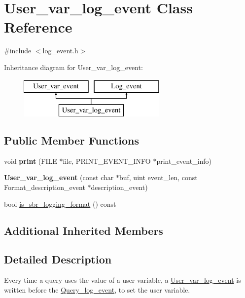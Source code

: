 \hypertarget{classUser__var__log__event}{}\section{User\+\_\+var\+\_\+log\+\_\+event Class Reference}
\label{classUser__var__log__event}


{\ttfamily \#include $<$log\+\_\+event.\+h$>$}

Inheritance diagram for User\+\_\+var\+\_\+log\+\_\+event\+:\begin{figure}[H]
\begin{center}
\leavevmode
\includegraphics[height=2.000000cm]{classUser__var__log__event}
\end{center}
\end{figure}
\subsection*{Public Member Functions}
\begin{DoxyCompactItemize}
\item 
\mbox{\label{classUser__var__log__event_a537a63ac9aabe8d0303c8d174cf879b3}} 
void {\bfseries print} (F\+I\+LE $\ast$file, P\+R\+I\+N\+T\+\_\+\+E\+V\+E\+N\+T\+\_\+\+I\+N\+FO $\ast$print\+\_\+event\+\_\+info)
\item 
\mbox{\label{classUser__var__log__event_afa9d1928f0ba121e13349439e01b6956}} 
{\bfseries User\+\_\+var\+\_\+log\+\_\+event} (const char $\ast$buf, uint event\+\_\+len, const Format\+\_\+description\+\_\+event $\ast$description\+\_\+event)
\item 
bool \mbox{\hyperlink{classUser__var__log__event_a324c3239a7fefb0ad5c0ae44984d1683}{is\+\_\+sbr\+\_\+logging\+\_\+format}} () const
\end{DoxyCompactItemize}
\subsection*{Additional Inherited Members}


\subsection{Detailed Description}
Every time a query uses the value of a user variable, a \mbox{\hyperlink{classUser__var__log__event}{User\+\_\+var\+\_\+log\+\_\+event}} is written before the \mbox{\hyperlink{classQuery__log__event}{Query\+\_\+log\+\_\+event}}, to set the user variable. 

